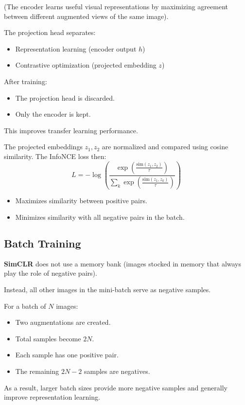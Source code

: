 (The encoder learns useful visual representations by maximizing agreement between different augmented views of the same image).

The projection head separates:
\begin{itemize}
    \item Representation learning (encoder output $h$)
    \item Contrastive optimization (projected embedding $z$)
\end{itemize}

After training:
\begin{itemize}
    \item The projection head is discarded.
    \item Only the encoder is kept.
\end{itemize}

This improves transfer learning performance.

The projected embeddings $z_1, z_2$ are normalized and compared using cosine similarity. The InfoNCE loss then:
\[
L = -\log \left( \frac{\exp\left( \frac{\text{sim}(z_1, z_2)}{\tau} \right)}{\sum_k \exp\left( \frac{\text{sim}(z_1, z_k)}{\tau} \right)} \right)
\]
\begin{itemize}
    \item Maximizes similarity between positive pairs.
    \item Minimizes similarity with all negative pairs in the batch.
\end{itemize}

\subsection{Batch Training}

\textbf{SimCLR} does not use a memory bank (images stocked in memory that always play the role of negative pairs).

Instead, all other images in the mini-batch serve as negative samples.

For a batch of $N$ images:
\begin{itemize}
    \item Two augmentations are created.
    \item Total samples become $2N$.
    \item Each sample has one positive pair.
    \item The remaining $2N - 2$ samples are negatives.
\end{itemize}

As a result, larger batch sizes provide more negative samples and generally improve representation learning.

